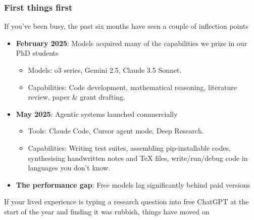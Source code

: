 \documentclass[aspectratio=169]{beamer}
\begin{document}
\begin{frame}
    \frametitle{First things first}
    If you've been busy, the past six months have seen a couple of inflection points
    \vspace{0.5cm}
    \begin{itemize}
        \item \textbf{February 2025}: Models acquired many of the capabilities we prize in our PhD students
            \begin{itemize}
                \item Models: o3 series, Gemini 2.5, Claude 3.5 Sonnet.
                \item Capabilities: Code development, mathematical reasoning, literature review, paper \& grant drafting.
            \end{itemize}
        \item \textbf{May 2025}: Agentic systems launched commercially
            \begin{itemize}
                \item Tools: Claude Code, Cursor agent mode, Deep Research.
                \item Capabilities: Writing test suites, assembling pip-installable codes, synthesising handwritten notes and TeX files, write/run/debug code in languages you don't know.
            \end{itemize}
        \item \textbf{The performance gap}: Free models lag significantly behind paid versions
    \end{itemize}
    
    \vspace{0.5cm}
    If your lived experience is typing a research question into free ChatGPT at the start of the year and finding it was rubbish, things have moved on
\end{frame}
\end{document}
